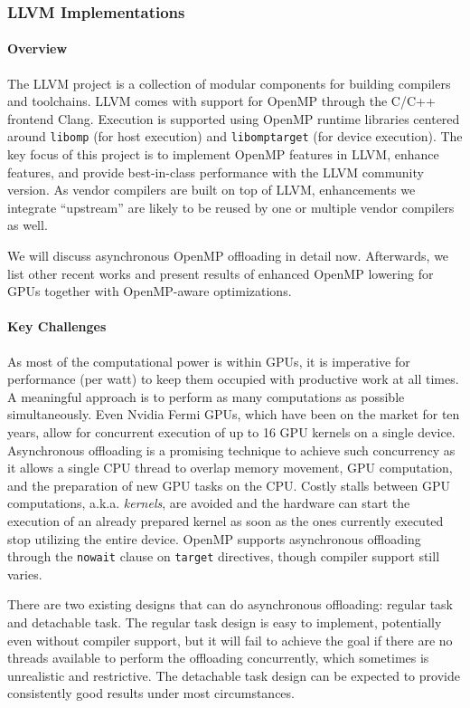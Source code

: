 \subsubsection{ LLVM Implementations }

\paragraph{Overview}
The LLVM project is a collection of modular components for building compilers and toolchains.
LLVM comes with support for OpenMP through the C/C++ frontend Clang.
Execution is supported using OpenMP runtime libraries centered around \lstinline{libomp} (for host execution) and \lstinline{libomptarget} (for device execution).
The key focus of this project is to implement OpenMP features in LLVM, enhance features, and provide best-in-class performance with the LLVM community version.
As vendor compilers are built on top of LLVM, enhancements we integrate ``upstream'' are likely to be reused
by one or multiple vendor compilers as well.

We will discuss asynchronous OpenMP offloading in detail now.
Afterwards, we list other recent works and present results of enhanced
OpenMP lowering for GPUs together with OpenMP-aware optimizations.

\paragraph{Key Challenges}

As most of the computational power is within GPUs, it is imperative for performance (per watt) to keep them occupied with productive work at all times. A meaningful approach is to perform as many computations as possible simultaneously. Even Nvidia Fermi GPUs, which have been on the market for ten years, allow for concurrent execution of up to 16 GPU kernels on a single device. Asynchronous offloading is a promising technique to achieve such concurrency as it allows a single CPU thread to overlap memory movement, GPU computation, and the preparation of new GPU tasks on the CPU.
Costly stalls between GPU computations, a.k.a. \emph{kernels}, are avoided and the hardware can start the execution of an already prepared kernel as soon as the ones currently executed stop utilizing the entire device. OpenMP supports asynchronous offloading through the \lstinline|nowait| clause on \lstinline|target| directives, though compiler support still varies.

There are two existing designs that can do asynchronous offloading: regular task and detachable task.
The regular task design is easy to implement, potentially even without compiler support, but it will fail to achieve the goal if there are no threads available to perform the offloading concurrently, which sometimes is unrealistic and restrictive.
The detachable task design can be expected to provide consistently good results under most circumstances.

